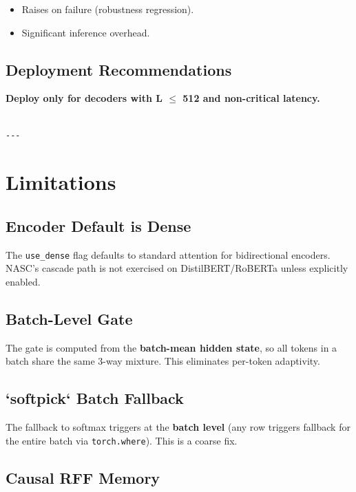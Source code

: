\begin{itemize}
\item Raises on failure (robustness regression).
\item Significant inference overhead.

\end{itemize}
\subsection{Deployment Recommendations}

\textbf{Deploy only for decoders with L $\le$ 512 and non-critical latency.}
\begin{lstlisting}

---
\end{lstlisting}


\section{Limitations}

\subsection{Encoder Default is Dense}

The \texttt{use\_dense} flag defaults to standard attention for bidirectional 
encoders. NASC's cascade path is not exercised on DistilBERT/RoBERTa 
unless explicitly enabled.

\subsection{Batch-Level Gate}

The gate is computed from the \textbf{batch-mean hidden state}, so all tokens 
in a batch share the same 3-way mixture. This eliminates per-token 
adaptivity.

\subsection{`softpick` Batch Fallback}

The fallback to softmax triggers at the \textbf{batch level} (any row triggers 
fallback for the entire batch via \texttt{torch.where}). This is a coarse fix.

\subsection{Causal RFF Memory}

